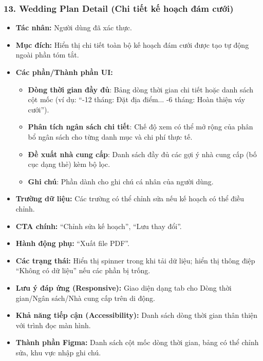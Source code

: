 \documentclass[11pt,a4paper]{article}
\begin{document}
\subsubsection{13. Wedding Plan Detail (Chi tiết kế hoạch đám cưới)}
\begin{itemize}
    \item \textbf{Tác nhân:} Người dùng đã xác thực.
    \item \textbf{Mục đích:} Hiển thị chi tiết toàn bộ kế hoạch đám cưới được tạo tự động ngoài phần tóm tắt.
    \item \textbf{Các phần/Thành phần UI:}
    \begin{itemize}
        \item \textbf{Dòng thời gian đầy đủ}: Bảng dòng thời gian chi tiết hoặc danh sách cột mốc (ví dụ: ``-12 tháng: Đặt địa điểm... -6 tháng: Hoàn thiện váy cưới'').
        \item \textbf{Phân tích ngân sách chi tiết}: Chế độ xem có thể mở rộng của phân bổ ngân sách cho từng danh mục và chi phí thực tế.
        \item \textbf{Đề xuất nhà cung cấp}: Danh sách đầy đủ các gợi ý nhà cung cấp (bố cục dạng thẻ) kèm bộ lọc.
        \item \textbf{Ghi chú}: Phần dành cho ghi chú cá nhân của người dùng.
    \end{itemize}
    \item \textbf{Trường dữ liệu:} Các trường có thể chỉnh sửa nếu kế hoạch có thể điều chỉnh.
    \item \textbf{CTA chính:} ``Chỉnh sửa kế hoạch'', ``Lưu thay đổi''.
    \item \textbf{Hành động phụ:} ``Xuất file PDF''.
    \item \textbf{Các trạng thái:} Hiển thị spinner trong khi tải dữ liệu; hiển thị thông điệp ``Không có dữ liệu'' nếu các phần bị trống.
    \item \textbf{Lưu ý đáp ứng (Responsive):} Giao diện dạng tab cho Dòng thời gian/Ngân sách/Nhà cung cấp trên di động.
    \item \textbf{Khả năng tiếp cận (Accessibility):} Danh sách dòng thời gian thân thiện với trình đọc màn hình.
    \item \textbf{Thành phần Figma:} Danh sách cột mốc dòng thời gian, bảng có thể chỉnh sửa, khu vực nhập ghi chú.
\end{itemize}
\end{document}

